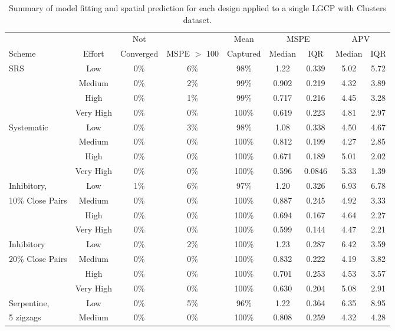 \documentclass[review]{elsarticle}
\begin{document}
\begin{table}[h!]\tiny
\caption{Summary of model fitting and spatial prediction for each design
applied to a single LGCP with Clusters dataset.}
\label{clusttable}
\begin{tabular}{|l|c|c|c|c|cc|cc|}
\hline
& & Not & & Mean & \multicolumn{2}{|c|}{MSPE} & \multicolumn{2}{|c|}{APV} \\
Scheme & Effort & Converged & MSPE \(>\) 100 & Captured &
Median & IQR & Median & IQR \\
\hline
SRS &   Low & 0\% & 6\% &  98\% & 1.22  & 0.339 & 5.02 & 5.72 \\
&    Medium & 0\% & 2\% &  99\% & 0.902 & 0.219 & 4.32 & 3.89 \\
&      High & 0\% & 1\% &  99\% & 0.717 & 0.216 & 4.45 & 3.28 \\
& Very High & 0\% & 0\% & 100\% & 0.619 & 0.223 & 4.81 & 2.97 \\
\hline
Systematic &   Low & 0\% & 3\% &  98\% & 1.08  & 0.338  & 4.50 & 4.67 \\
&           Medium & 0\% & 0\% & 100\% & 0.812 & 0.199  & 4.27 & 2.85 \\
&             High & 0\% & 0\% & 100\% & 0.671 & 0.189  & 5.01 & 2.02 \\
&        Very High & 0\% & 0\% & 100\% & 0.596 & 0.0846 & 5.33 & 1.39 \\
\hline
Inhibitory, &         Low & 1\% & 6\% &  97\% & 1.20  & 0.326 & 6.93 & 6.78 \\
10\% Close Pairs & Medium & 0\% & 0\% & 100\% & 0.887 & 0.245 & 4.92 & 3.33 \\
&                    High & 0\% & 0\% & 100\% & 0.694 & 0.167 & 4.64 & 2.27 \\
&               Very High & 0\% & 0\% & 100\% & 0.599 & 0.144 & 4.47 & 2.21 \\
\hline
Inhibitory &          Low & 0\% & 2\% & 100\% & 1.23  & 0.287 & 6.42 & 3.59 \\
20\% Close Pairs & Medium & 0\% & 0\% & 100\% & 0.832 & 0.222 & 4.19 & 3.82 \\
&                    High & 0\% & 0\% & 100\% & 0.701 & 0.253 & 4.53 & 3.57 \\
&               Very High & 0\% & 0\% & 100\% & 0.630 & 0.204 & 5.08 & 2.91 \\
\hline
Serpentine, & Low  & 0\% & 5\% &  96\% & 1.22  & 0.364  & 6.35 & 8.95 \\
5 zigzags & Medium & 0\% & 0\% & 100\% & 0.808 & 0.259  & 4.32 & 4.28 \\

\end{tabular}
\end{table}
\end{document}
